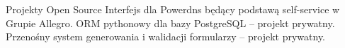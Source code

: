 \begin{rubric}{Projekty Open Source}
Interfejs dla Powerdns będący podstawą \hbox{self-service} w Grupie Allegro.
ORM pythonowy dla bazy PostgreSQL -- projekt prywatny.
Przenośny system generowania i walidacji formularzy -- projekt prywatny.
\end{rubric}
